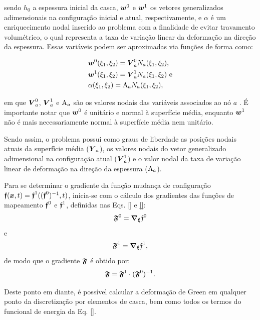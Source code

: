 \noindent sendo $h_0$ a espessura inicial da casca, $\boldsymbol{w}^0$ e $\boldsymbol{w}^1$ os vetores generalizados adimensionais na configuração inicial e atual, respectivamente, e $\alpha$ é um enriquecimento nodal inserido ao problema com a finalidade de evitar travamento volumétrico, o qual representa a taxa de variação linear da deformação na direção da espessura. Essas variáveis podem ser aproximadas via funções de forma como:

\begin{subequations}
    \begin{align}
         & \boldsymbol{w}^0(\xi_1,\xi_2)=\boldsymbol{V}^0_aN_a(\xi_1,\xi_2)\text{,}  \\
         & \boldsymbol{w}^1(\xi_1,\xi_2)=\boldsymbol{V}^1_aN_a(\xi_1,\xi_2)\text{ e} \\
         & \alpha(\xi_1,\xi_2)=\mathrm{A}_aN_a(\xi_1,\xi_2)\text{,}
    \end{align}
\end{subequations}

\noindent em que $\boldsymbol{V}^0_a$, $\boldsymbol{V}^1_a$ e $\mathrm{A}_a$ são os valores nodais das variáveis associados ao nó $a$ \cite{sanches2013unconstrained,sanches2014fluid}. É importante notar que $\boldsymbol{w}^0$ é unitário e normal à superfície média, enquanto $\boldsymbol{w}^1$ não é mais necessariamente normal à superfície média nem unitário.

Sendo assim, o problema possui como graus de liberdade as posições nodais atuais da superfície média ($\boldsymbol{Y}_a$), os valores nodais do vetor generalizado adimensional na configuração atual ($\boldsymbol{V}^1_a$) e o valor nodal da taxa de variação linear de deformação na direção da espessura ($\mathrm{A}_a$).

Para se determinar o gradiente da função mudança de configuração $\boldsymbol{\mathfrak{f}}(\boldsymbol{x},t)=\boldsymbol{\mathfrak{f}}^1((\boldsymbol{\mathfrak{f}}^0)^{-1},t)$, inicia-se com o cálculo dos gradientes das funções de mapeamento $\boldsymbol{\mathfrak{f}}^0$ e $\boldsymbol{\mathfrak{f}}^1$, definidas nas Eqs. \eqref{} e \eqref{}:
\begin{equation}
    \boldsymbol{\mathfrak{F}}^0=\boldsymbol{\nabla_\xi}\boldsymbol{\mathfrak{f}}^0 
\end{equation}
e
\begin{equation}
    \boldsymbol{\mathfrak{F}}^1=\boldsymbol{\nabla_\xi}\boldsymbol{\mathfrak{f}}^1, 
\end{equation}
de modo que o gradiente $\boldsymbol{\mathfrak{F}}$ é obtido por:
\begin{equation}
\boldsymbol{\mathfrak{F}}=\boldsymbol{\mathfrak{F}}^1\cdot(\boldsymbol{\mathfrak{F}}^0)^{-1}.
\end{equation}

Deste ponto em diante, é possível calcular a deformação de Green em qualquer ponto da discretização por elementos de casca, bem como todos os termos do funcional de energia da Eq. \eqref{}.

